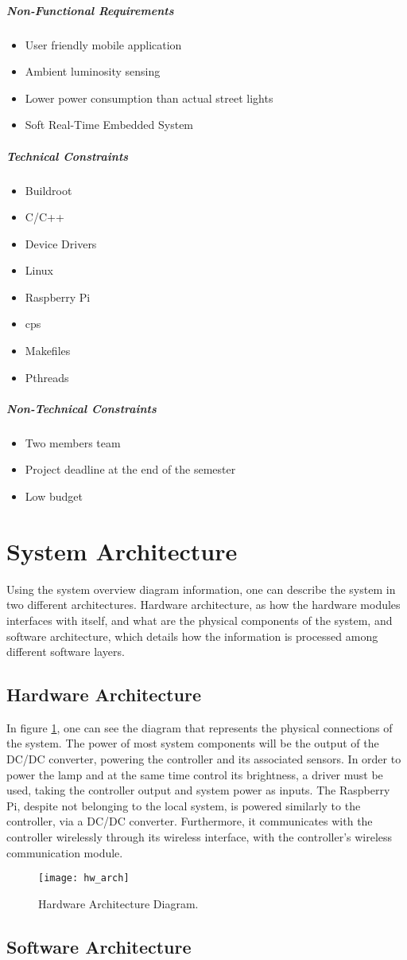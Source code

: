\subparagraph{Non-Functional Requirements}
\begin{itemize}
	\item User friendly mobile application
	\item Ambient luminosity sensing
	\item Lower power consumption than actual street lights
	\item Soft Real-Time Embedded System
\end{itemize}

\subparagraph{Technical Constraints}
\begin{itemize}
	\item Buildroot
	\item C/C++ 
	\item Device Drivers
	\item Linux
	\item Raspberry Pi
	\item \ac{cps}
	\item Makefiles
	\item Pthreads
\end{itemize}

\subparagraph{Non-Technical Constraints}
\begin{itemize}
	\item Two members team
	\item Project deadline at the end of the semester
	\item Low budget
	
\end{itemize}

\section{System Architecture}
Using the system overview diagram information, one can describe the system in two different architectures. Hardware architecture, as how the hardware modules interfaces with itself, and what are the physical components of the system, and software architecture, which details how the information is processed among different software layers.

\subsection{Hardware Architecture}
In figure \ref{fig:hw_arch}, one can see the diagram that represents the physical connections of the system. The power of most system components will be the output of the DC/DC converter, powering the controller and its associated sensors. In order to power the lamp and at the same time control its brightness, a driver must be used, taking the controller output and system power as inputs. The Raspberry Pi, despite not belonging to the local system, is powered similarly to the controller, via a DC/DC converter. Furthermore, it communicates with the controller wirelessly through its wireless interface, with the controller's wireless communication module.

\begin{figure}[ht]
	\centering
	\texttt{[image: hw\_arch]}
	\caption{Hardware Architecture Diagram.}
	\label{fig:hw_arch}
\end{figure}

\subsection{Software Architecture}
